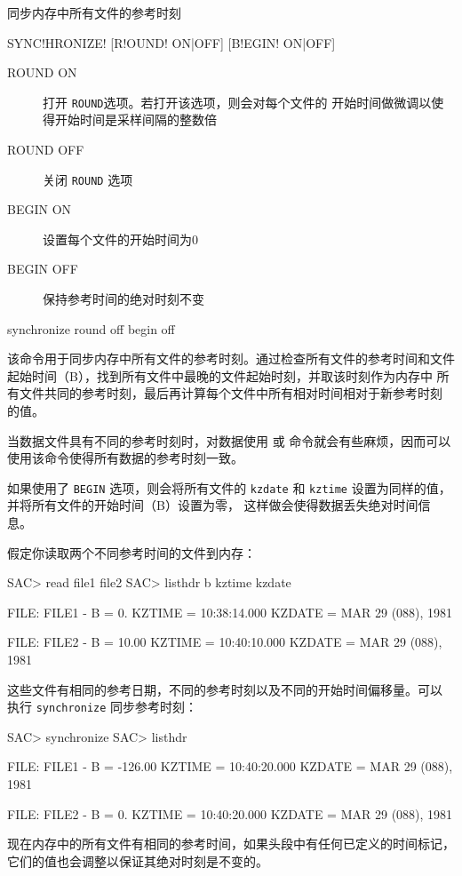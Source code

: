 \label{cmd:synchronize}

同步内存中所有文件的参考时刻

\begin{SACSTX}
SYNC!HRONIZE! [R!OUND! ON|OFF] [B!EGIN! ON|OFF]
\end{SACSTX}

\begin{description}
\item [ROUND ON] 打开 \texttt{ROUND}选项。若打开该选项，则会对每个文件的
    开始时间做微调以使得开始时间是采样间隔的整数倍
\item [ROUND OFF] 关闭 \texttt{ROUND} 选项
\item [BEGIN ON] 设置每个文件的开始时间为0
\item [BEGIN OFF] 保持参考时间的绝对时刻不变
\end{description}

\begin{SACDFT}
synchronize round off begin off
\end{SACDFT}

该命令用于同步内存中所有文件的参考时刻。通过检查所有文件的参考时间和文件
起始时间（B），找到所有文件中最晚的文件起始时刻，并取该时刻作为内存中
所有文件共同的参考时刻，最后再计算每个文件中所有相对时间相对于新参考时刻
的值。

当数据文件具有不同的参考时刻时，对数据使用  或 
命令就会有些麻烦，因而可以使用该命令使得所有数据的参考时刻一致。

如果使用了 \texttt{BEGIN} 选项，则会将所有文件的 \texttt{kzdate} 和
\texttt{kztime} 设置为同样的值，并将所有文件的开始时间（B）设置为零，
这样做会使得数据丢失绝对时间信息。

假定你读取两个不同参考时间的文件到内存：
\begin{SACCode}
SAC> read file1 file2
SAC> listhdr b kztime kzdate

  FILE: FILE1
  -
  B = 0.
  KZTIME = 10:38:14.000
  KZDATE = MAR 29 (088), 1981

  FILE: FILE2
  -
  B = 10.00
  KZTIME = 10:40:10.000
  KZDATE = MAR 29 (088), 1981
\end{SACCode}

这些文件有相同的参考日期，不同的参考时刻以及不同的开始时间偏移量。可以
执行 \texttt{synchronize} 同步参考时刻：
\begin{SACCode}
SAC> synchronize
SAC> listhdr

  FILE: FILE1
  -
  B = -126.00
  KZTIME = 10:40:20.000
  KZDATE = MAR 29 (088), 1981

  FILE: FILE2
  -
  B = 0.
  KZTIME = 10:40:20.000
  KZDATE = MAR 29 (088), 1981
\end{SACCode}
现在内存中的所有文件有相同的参考时间，如果头段中有任何已定义的时间标记，
它们的值也会调整以保证其绝对时刻是不变的。
